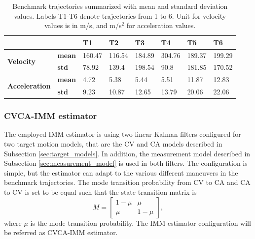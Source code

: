 \documentclass[english, 12pt, a4paper, elec, utf8, a-1b, online]{aaltothesis}
\begin{document}
\begin{table}[htb]
    \centering
\begin{tabular}{|l|l|l|l|l|l|l|l|}
\hline
\multicolumn{2}{|l|}{}                                 & \textbf{T1} & \textbf{T2} & \textbf{T3} & \textbf{T4} & \textbf{T5} & \textbf{T6} \\ \hline
\multirow{2}{*}{\textbf{Velocity}}     & \textbf{mean} & 160.47      & 116.54      & 184.89      & 304.76      & 189.37      & 199.29      \\ \cline{2-8} 
                                       & \textbf{std}  & 78.92       & 139.4       & 198.54      & 90.8        & 181.85      & 170.52      \\ \hline
\multirow{2}{*}{\textbf{Acceleration}} & \textbf{mean} & 4.72        & 5.38        & 5.44        & 5.51        & 11.87       & 12.83       \\ \cline{2-8} 
                                       & \textbf{std}  & 9.23        & 10.87       & 12.65       & 13.79       & 20.06       & 22.06       \\ \hline
\end{tabular}
    \caption{Benchmark trajectories summarized with mean and standard deviation values. Labels T1-T6 denote trajectories from 1 to 6. Unit for velocity values is in m/s, and m/s$^2$ for acceleration values.}
    \label{tab:benchmark_table}
\end{table}


\subsubsection{CVCA-IMM estimator}\label{sec:cvca_imm}

\newcommand{\varcv}{\sigma_\text{cv}^2}
\newcommand{\varca}{\sigma_\text{ca}^2}
\newcommand{\msp}{\mu}

The employed IMM estimator is using two linear Kalman filters configured for two target motion models, that are the CV and CA models described in Subsection \ref{sec:target_models}.
In addition, the measurement model described in Subsection \ref{sec:measurement_model} is used in both filters.
The configuration is simple, but the estimator can adapt to the various different maneuvers in the benchmark trajectories.
The mode transition probability from CV to CA and CA to CV is set to be equal such that the state transition matrix is
\begin{equation}
    M = 
\begin{bmatrix}
1 - \msp & \msp\\ 
\msp & 1 - \msp
\end{bmatrix},
\end{equation}
where $\msp$ is the mode transition probability.
The IMM estimator configuration will be referred as CVCA-IMM estimator.
\end{document}
